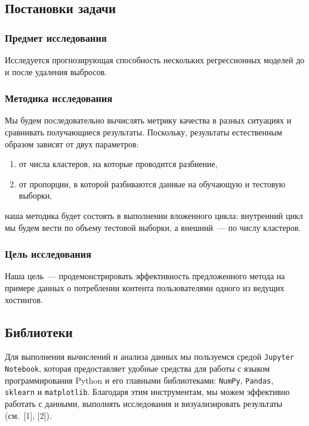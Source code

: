 \documentclass[a4paper,12pt]{article}
\begin{document}
\subsection{Постановки задачи}

\subsubsection{Предмет исследования}Исследуется прогнозирующая способность нескольких регрессионных моделей до и после удаления выбросов. 

\subsubsection{Методика исследования} Мы будем последовательно вычислять метрику качества в разных ситуациях и сравнивать получающиеся результаты. Поскольку, результаты естественным образом зависят от двух параметров:

\medskip\noindent 

\begin{enumerate}
	\item от числа кластеров, на которые проводится разбиение,
	\item от пропорции, в которой разбиваются данные на обучающую и тестовую выборки,
\end{enumerate}

\medskip\noindent 
наша методика будет состоять в выполнении вложенного цикла: внутренний цикл мы будем вести по объему тестовой выборки, а внешний — по числу кластеров.

\subsubsection{Цель исследования} 

Наша цель — продемонстрировать эффективность предложенного метода на примере данных о потреблении контента пользователями одного из ведущих хостингов.

\subsection{Библиотеки}
Для выполнения вычислений и анализа данных мы пользуемся средой \texttt{Jupyter Notebook}, которая предоставляет удобные средства для работы с языком программирования Python и его главными библиотеками: \texttt{NumPy}, \texttt{Pandas}, \texttt{sklearn} и \texttt{matplotlib}. Благодаря этим инструментам, мы можем эффективно работать с данными, выполнять исследования и визуализировать результаты (см. [1], [2]). 
\end{document}
